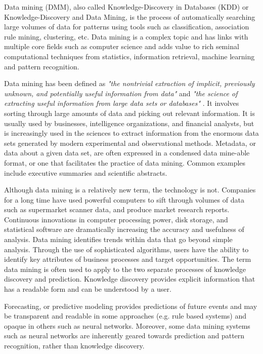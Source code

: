 \documentclass[12pt]{article}
\begin{document}
\newpage




Data mining (DMM), also called Knowledge-Discovery in Databases (KDD) or Knowledge-Discovery and Data Mining, is the process of automatically searching large volumes of data for patterns using tools such as classification, association rule mining, clustering, etc. Data mining is a complex topic and has links with multiple core fields such as computer science and adds value to rich seminal computational techniques from statistics, information retrieval, machine learning and pattern recognition.




Data mining has been defined as \emph{"the nontrivial extraction of implicit, previously unknown, and potentially useful information from data"} and \emph{"the science of extracting useful information from large data sets or databases" }. It involves sorting through large amounts of data and picking out relevant information. It is usually used by businesses, intelligence organizations, and financial analysts, but is increasingly used in the sciences to extract information from the enormous data sets generated by modern experimental and observational methods. Metadata, or data about a given data set, are often expressed in a condensed data mine-able format, or one that facilitates the practice of data mining. Common examples include executive summaries and scientific abstracts.




Although data mining is a relatively new term, the technology is not. Companies for a long time have used powerful computers to sift through volumes of data such as supermarket scanner data, and produce market research reports. Continuous innovations in computer processing power, disk storage, and statistical software are dramatically increasing the accuracy and usefulness of analysis. Data mining identifies trends within data that go beyond simple analysis. Through the use of sophisticated algorithms, users have the ability to identify key attributes of business processes and target opportunities. The term data mining is often used to apply to the two separate processes of knowledge discovery and prediction. Knowledge discovery provides explicit information that has a readable form and can be understood by a user.

Forecasting, or predictive modeling provides predictions of future events and may be transparent and readable in some approaches (e.g. rule based systems) and opaque in others such as neural networks. Moreover, some data mining systems such as neural networks are inherently geared towards prediction and pattern recognition, rather than knowledge discovery.
\end{document}
